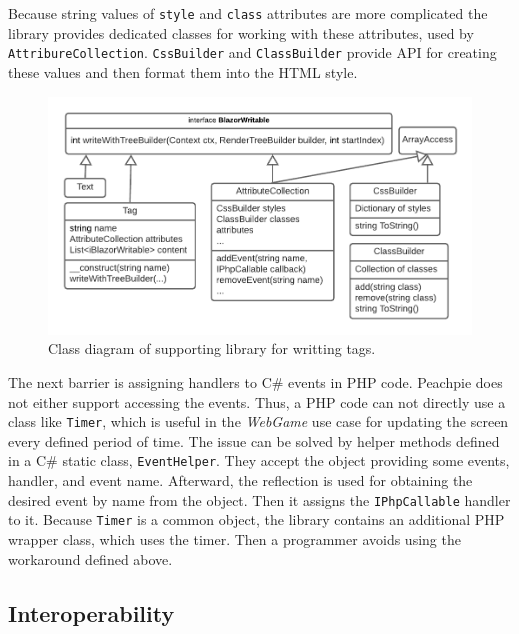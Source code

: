 Because string values of \texttt{style} and \texttt{class} attributes are more complicated the library provides dedicated classes for working with these attributes, used by \texttt{AttribureCollection}.
\texttt{CssBuilder} and \texttt{ClassBuilder} provide API for creating these values and then format them into the HTML style.
\par
\begin{figure}\centering
\includegraphics[scale=0.8]{./img/ComponentLibrary}
\caption{Class diagram of supporting library for writting tags.}
\label{img16:diagram}
\end{figure} 
\par
The next barrier is assigning handlers to C\# events in PHP code.
Peachpie does not either support accessing the events.
Thus, a PHP code can not directly use a class like \texttt{Timer}, which is useful in the \textit{WebGame} use case for updating the screen every defined period of time.
The issue can be solved by helper methods defined in a C\# static class, \texttt{EventHelper}.
They accept the object providing some events, handler, and event name.
Afterward, the reflection is used for obtaining the desired event by name from the object.
Then it assigns the \texttt{IPhpCallable} handler to it.
Because \texttt{Timer} is a common object, the library contains an additional PHP wrapper class, which uses the timer.
Then a programmer avoids using the workaround defined above.

\subsection{Interoperability}


